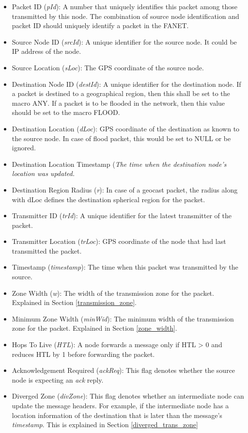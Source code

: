\begin{itemize}
\item Packet ID (\emph{pId}): A number that uniquely identifies this packet among those transmitted by this node. The combination of source node identification and packet ID should uniquely identify a packet in the FANET. 
\item Source Node ID (\emph{srcId}): A unique identifier for the source node. It could be IP address of the node.
\item Source Location (\emph{sLoc}): The GPS coordinate of the source node.
\item Destination Node ID (\emph{destId}): A unique identifier for the destination node. If a packet is destined to a geographical region, then this shall be set to the macro ANY. If a packet is to be flooded in the network, then this value should be set to the macro FLOOD. 
\item Destination Location (\emph{dLoc}): GPS coordinate of the destination as known to the source node. In case of flood packet, this would be set to NULL or be ignored. 
\item Destination Location Timestamp (\emph{The time when the destination node's location was updated.}
\item Destination Region Radius (\emph{r}): In case of a geocast packet, the radius along with dLoc defines the destination spherical region for the packet.
\item Transmitter ID (\emph{trId}): A unique identifier for the latest transmitter of the packet.
\item Transmitter Location (\emph{trLoc}): GPS coordinate of the node that had last transmitted the packet.
\item Timestamp (\emph{timestamp}): The time when this packet was transmitted by the source.
\item Zone Width (\emph{w}): The width of the transmission zone for the packet. Explained in Section \ref{transmission_zone}.
\item Minimum Zone Width (\emph{minWid}): The minimum width of the transmission zone for the packet. Explained in Section \ref{zone_width}.
\item Hops To Live (\emph{HTL}): A node forwards a message only if HTL > 0 and reduces HTL by 1 before forwarding the packet. 
\item Acknowledgement Required (\emph{ackReq}): This flag denotes whether the source node is expecting an \emph{ack} reply.
\item Diverged Zone (\emph{divZone}): This flag denotes whether an intermediate node can update the message headers. For example, if the intermediate node has a location information of the destination that is later than the message's \emph{timestamp}. This is explained in Section \ref{diverged_trans_zone}

\end{itemize}


